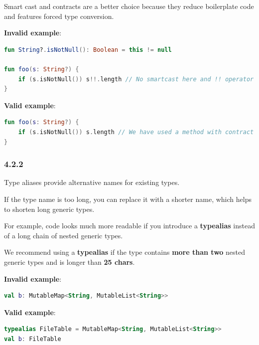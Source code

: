 {{{{{{{{{{{{{{{{{{{{Smart cast and contracts are a better choice because they reduce boilerplate code and features forced type conversion.



\textbf{Invalid example}:

\begin{lstlisting}[language=Kotlin]
fun String?.isNotNull(): Boolean = this != null

fun foo(s: String?) {
    if (s.isNotNull()) s!!.length // No smartcast here and !! operator is used
}
\end{lstlisting}


\textbf{Valid example}:

\begin{lstlisting}[language=Kotlin]
fun foo(s: String?) {
    if (s.isNotNull()) s.length // We have used a method with contract from stdlib that helped compiler to execute smart cast
}
\end{lstlisting}


\subsubsection*{\textbf{4.2.2}}
\leavevmode\newline

\label{sec:4.2.2}



Type aliases provide alternative names for existing types.

If the type name is too long, you can replace it with a shorter name, which helps to shorten long generic types.

For example, code looks much more readable if you introduce a \textbf{typealias} instead of a long chain of nested generic types.

We recommend using a \textbf{typealias} if the type contains \textbf{more than two} nested generic types and is longer than \textbf{25 chars}.



\textbf{Invalid example}:

\begin{lstlisting}[language=Kotlin]
val b: MutableMap<String, MutableList<String>>
\end{lstlisting}


\textbf{Valid example}:

\begin{lstlisting}[language=Kotlin]
typealias FileTable = MutableMap<String, MutableList<String>>
val b: FileTable
\end{lstlisting}


}}}}}}}}}}}}}}}}}}}}
